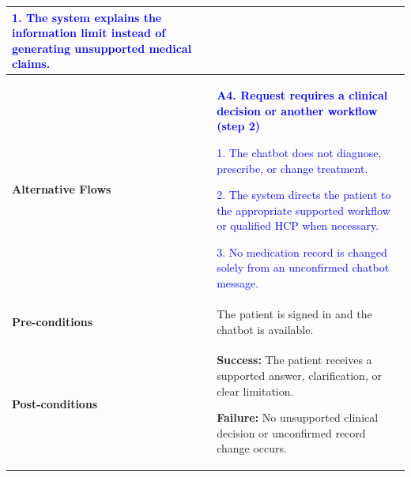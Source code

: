 \begin{longtable}{|p{}|p{}|}
\textcolor{blue}{1. The system explains the information limit instead of generating unsupported medical claims.}
\\ \hline
\textbf{Alternative Flows} &
\textcolor{blue}{\textbf{A4. Request requires a clinical decision or another workflow (step 2)}}\par
\textcolor{blue}{1. The chatbot does not diagnose, prescribe, or change treatment.}\par
\textcolor{blue}{2. The system directs the patient to the appropriate supported workflow or qualified HCP when necessary.}\par
\textcolor{blue}{3. No medication record is changed solely from an unconfirmed chatbot message.}
\\ \hline
\textbf{Pre-conditions} & The patient is signed in and the chatbot is available. \\ \hline
\textbf{Post-conditions} & \textbf{Success:} The patient receives a supported answer, clarification, or clear limitation.\par
\textbf{Failure:} No unsupported clinical decision or unconfirmed record change occurs. \\ \hline
\end{longtable}
\clearpage
